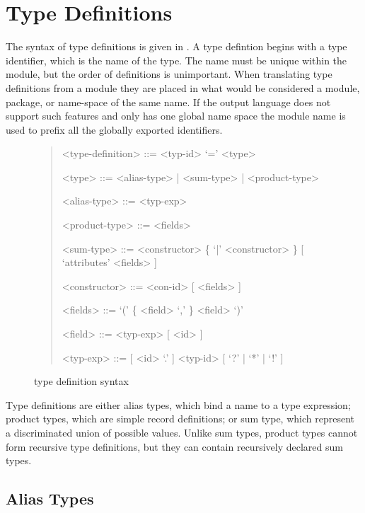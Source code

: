 \section{Type Definitions}

The syntax of type definitions is given in .
A type defintion begins with a type identifier, which is the name of the type.
The name must be unique within the module, but the order of definitions is unimportant.
When translating type definitions from a module they are placed in what would be considered a
module, package, or name-space of the same name.
If the output language does not support such features and only has one global
name space the module name
is used to prefix all the globally exported identifiers.

\begin{figure}[t]
  \begin{quote}
    \begin{grammar}
      <type-definition>  ::=  <typ-id> `=' <type>

      <type>         ::= <alias-type> | <sum-type> | <product-type>

      <alias-type>   ::= <typ-exp>
      
      <product-type> ::= <fields>

      <sum-type>     ::= <constructor> \{ `|' <constructor> \} [ `attributes' <fields> ]

      <constructor>  ::= <con-id> [ <fields> ]

      <fields>       ::= `(' \{ <field>  `,' \} <field> `)'

      <field>        ::=  <typ-exp> [ <id> ]
      
      <typ-exp>      ::= [ <id> `.' ] <typ-id> [ `?' | `*' | `!' ]
    \end{grammar}
  \end{quote}
  \caption{\asdl{} type definition syntax}
  \label{fig:type-syntax}
\end{figure}%

Type definitions are either alias types, which bind a name to a type expression;
product types, which are simple record definitions;
or sum type, which represent a discriminated union of possible values.
Unlike sum types, product types cannot form recursive type definitions, but they can
contain recursively declared sum types.

\subsection{Alias Types}

